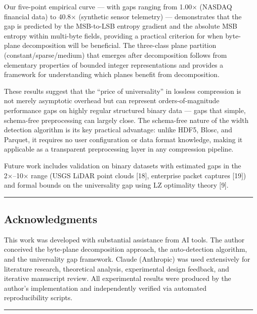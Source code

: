 \documentclass[
  11pt,
  letterpaper,
]{article}
\makeatletter
\renewcommand{\_}{\bpd@origunderscore\allowbreak}
\makeatother
\begin{document}
Our five-point empirical curve --- with gaps ranging from 1.00× (NAS\-DAQ
financial data) to 40.8× (synthetic sensor telemetry) --- demonstrates
that the gap is predicted by the MSB-to-LSB entropy gradient and the
absolute MSB entropy within multi-byte fields, providing a practical
criterion for when byte-plane decomposition will be beneficial. The
three-class plane partition (constant/sparse/medium) that emerges after
decomposition follows from elementary properties of bounded integer
representations and provides a framework for understanding which planes
benefit from decomposition.

These results suggest that the ``price of universality'' in lossless
compression is not merely asymptotic overhead but can represent
orders-of-magnitude performance gaps on highly regular structured binary
data --- gaps that simple, schema-free preprocessing can largely close.
The schema-free nature of the width detection algorithm is its key
practical advantage: unlike HDF5, Blosc, and Parquet, it requires no
user configuration or data format knowledge, making it applicable as a
transparent preprocessing layer in any compression pipeline.

Future work includes validation on binary datasets with estimated gaps
in the 2×--10× range (USGS LiDAR point clouds {[}18{]}, enterprise
packet captures {[}19{]}) and formal bounds on the universality gap
using LZ optimality theory {[}9{]}.

\begin{center}\rule{0.5\linewidth}{0.5pt}\end{center}

\hypertarget{acknowledgments}{%
\subsection{Acknowledgments}\label{acknowledgments}}

This work was developed with substantial assistance from AI tools. The
author conceived the byte-plane decomposition approach, the
auto-detection algorithm, and the universality gap framework. Claude
(Anthropic) was used extensively for literature research, theoretical
analysis, experimental design feedback, and iterative manuscript review.
All experimental results were produced by the author's implementation
and independently verified via automated reproducibility scripts.

\begin{center}\rule{0.5\linewidth}{0.5pt}\end{center}
\end{document}
